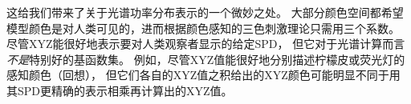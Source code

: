 这给我们带来了关于光谱功率分布表示的一个微妙之处。
大部分颜色空间都希望模型颜色是对人类可见的，进而根据颜色感知的三色刺激理论只需用三个系数。
尽管XYZ能很好地表示要对人类观察者显示的给定SPD，
但它对于光谱计算而言{\itshape 不是}特别好的基函数集。
例如，尽管XYZ值能很好地分别描述柠檬皮或荧光灯的感知颜色（回想），
但它们各自的XYZ值之积给出的XYZ颜色可能明显不同于用其SPD更精确的表示相乘再计算出的XYZ值。

